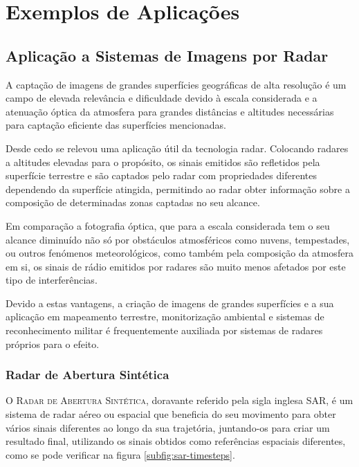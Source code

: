 \documentclass[purist,portuguese]{ist-report}
\begin{document}
\section{Exemplos de Aplicações}

\subsection{Aplicação a Sistemas de Imagens por Radar}

A captação de imagens de grandes superfícies geográficas de alta resolução é um campo de elevada relevância e dificuldade devido à escala considerada e a atenuação óptica da atmosfera para grandes distâncias e altitudes necessárias para captação eficiente das superfícies mencionadas.

Desde cedo se relevou uma aplicação útil da tecnologia radar. Colocando radares a altitudes elevadas para o propósito, os sinais emitidos são refletidos pela superfície terrestre e são captados pelo radar com propriedades diferentes dependendo da superfície atingida, permitindo ao radar obter informação sobre a composição de determinadas zonas captadas no seu alcance.

Em comparação a fotografia óptica, que para a escala considerada tem o seu alcance diminuído não só por obstáculos atmosféricos como nuvens, tempestades, ou outros fenómenos meteorológicos, como também pela composição da atmosfera em si, os sinais de rádio emitidos por radares são muito menos afetados por este tipo de interferências.

Devido a estas vantagens, a criação de imagens de grandes superfícies e a sua aplicação em mapeamento terrestre, monitorização ambiental e sistemas de reconhecimento militar é frequentemente auxiliada por sistemas de radares próprios para o efeito.

\subsubsection{Radar de Abertura Sintética}

O \textsc{Radar de Abertura Sintética}, doravante referido pela sigla inglesa SAR, é um sistema de radar aéreo ou espacial que beneficia do seu movimento para obter vários sinais diferentes ao longo da sua trajetória, juntando-os para criar um resultado final, utilizando os sinais obtidos como referências espaciais diferentes, como se pode verificar na figura \ref{subfig:sar-timesteps}.
\end{document}
